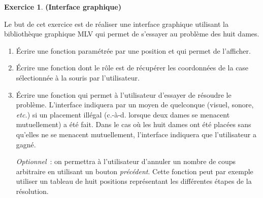 \documentclass[12pt]{article}
\theoremstyle{definition}
\newtheorem{Exercice}{Exercice}
\begin{document}
\begin{Exercice}{\bf (Interface graphique)}\smallskip

Le but de cet exercice est de réaliser une interface graphique
utilisant la bibliothèque graphique {\sf MLV} qui permet de s'essayer
au problème des huit dames.

\begin{enumerate}
    \item Écrire une fonction paramétrée par une position et qui
    permet de l'afficher.
    \smallskip

    \item Écrire une fonction dont le rôle est de récupérer les
    coordonnées de la case sélectionnée à la souris par l'utilisateur.
    \smallskip

    \item Écrire une fonction qui permet à l'utilisateur d'essayer
    de résoudre le problème. L'interface indiquera par un moyen de
    quelconque (visuel, sonore, {\em etc.}) si un placement
    illégal (c.-à-d. lorsque deux dames se menacent mutuellement)
    a été fait. Dans le cas où les huit dames ont été placées sans
    qu'elles ne se menacent mutuellement, l'interface indiquera
    que l'utilisateur a gagné.
    \smallskip

    {\em Optionnel}~: on permettra à l'utilisateur d'annuler un
    nombre de coups arbitraire en utilisant un bouton {\em précédent}.
    Cette fonction peut par exemple utiliser un tableau de huit
    positions représentant les différentes étapes de la résolution.
\end{enumerate}
\end{Exercice}
\bigskip
\end{document}
